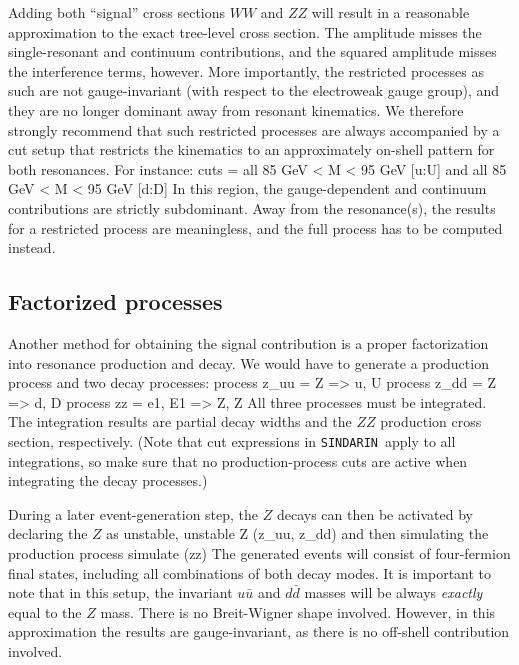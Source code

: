 \documentclass[12pt]{book}
\newenvironment{Code}%
  {\begingroup\footnotesize
   \quote
   \Verbatim[frame=single]}%
  {\endVerbatim
   \endquote
   \endgroup\noindent}
\newcommand{\ttt}[1]{\texttt{#1}}
\newcommand{\sindarin}{\ttt{SINDARIN}}
\begin{document}
Adding both ``signal'' cross sections $WW$ and $ZZ$ will result in a
reasonable approximation to the exact tree-level cross section.  The amplitude
misses the single-resonant and continuum contributions, and the squared
amplitude misses the interference terms, however.  More importantly, the
restricted processes as such are not gauge-invariant (with respect to the
electroweak gauge group), and they are no longer dominant away from resonant
kinematics.  We therefore strongly recommend that such restricted processes
are always accompanied by a cut setup that restricts the kinematics to an
approximately on-shell pattern for both resonances.  For instance:
\begin{Code}
  cuts = all 85 GeV < M < 95 GeV [u:U]
     and all 85 GeV < M < 95 GeV [d:D]
\end{Code}
In this region, the gauge-dependent and continuum contributions are strictly
subdominant.  Away from the resonance(s), the results for a restricted process
are meaningless, and the full process has to be computed instead.

\subsection{Factorized processes}

Another method for obtaining the signal contribution is a proper factorization
into resonance production and decay.  We would have to generate a production
process and two decay processes:
\begin{Code}
        process z_uu = Z => u, U
        process z_dd = Z => d, D
        process zz = e1, E1 => Z, Z
\end{Code}
All three processes must be integrated.  The integration results are partial
decay widths and the $ZZ$ production cross section, respectively.  (Note that
cut expressions in \sindarin\ apply to all integrations, so make sure that
no production-process cuts are active when integrating the decay
processes.)

During a later event-generation step, the $Z$ decays can then be activated by declaring the $Z$ as
unstable,
\begin{Code}
        unstable Z (z_uu, z_dd)
\end{Code}
and then simulating the production process
\begin{Code}
        simulate (zz)
\end{Code}
The generated events will consist of four-fermion final states, including all
combinations of both decay modes.  It is important to note that in this setup,
the invariant $u\bar u$ and $d\bar d$ masses will be always \emph{exactly}
equal to the $Z$ mass.  There is no Breit-Wigner shape involved.  However, in
this approximation the results are gauge-invariant, as there is no off-shell
contribution involved.
\end{document}
